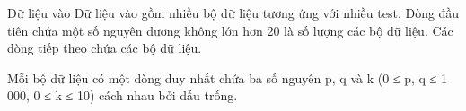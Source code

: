 Dữ liệu vào
Dữ liệu vào gồm nhiều bộ dữ liệu tương ứng với nhiều test. Dòng đầu tiên chứa một số nguyên dương không lớn hơn 20 là số lượng các bộ dữ liệu. Các dòng tiếp theo chứa các bộ dữ liệu.

Mỗi bộ dữ liệu có một dòng duy nhất chứa ba số nguyên p, q và k (0 ≤ p, q ≤ 1 000, 0 ≤ k ≤ 10) cách nhau bởi dấu trống.